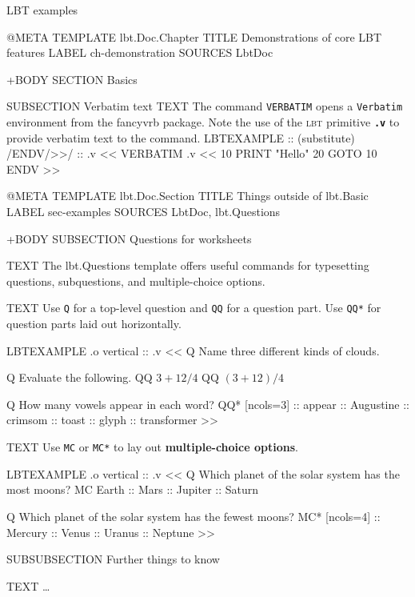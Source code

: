 \documentclass[a4paper,oneside,11pt,article]{memoir}
\begin{document}
\lbtDraftModeOff{}

{\Huge LBT examples}

\tableofcontents
\clearpage

\newcommand{\package}[1]{{\color{NavyBlue}\textsf{#1}}}
\newcommand{\code}[1]{{\color{NavyBlue}\texttt{#1}}}
\newcommand{\boldcode}[1]{{\bfseries\color{NavyBlue}\texttt{#1}}}
\newcommand{\lbtlogo}{\textsc{lbt}}

\begin{lbt}
  @META
    TEMPLATE   lbt.Doc.Chapter
    TITLE      Demonstrations of core LBT features
    LABEL      ch-demonstration
    SOURCES    LbtDoc

  +BODY
    SECTION Basics

    SUBSECTION Verbatim text
    TEXT The command \code{VERBATIM} opens a \code{Verbatim} environment from the \package{fancyvrb} package. Note the use of the \lbtlogo{} primitive \boldcode{.v} to provide verbatim text to the command.
    LBTEXAMPLE :: (substitute) /ENDV/>>/ :: .v <<
      VERBATIM .v <<
        10 PRINT "Hello"
        20 GOTO 10
      ENDV
    >>
\end{lbt}

\begin{lbt}
  @META
    TEMPLATE   lbt.Doc.Section
    TITLE      Things outside of lbt.Basic
    LABEL      sec-examples
    SOURCES    LbtDoc, lbt.Questions

  +BODY
    SUBSECTION Questions for worksheets

    TEXT The \package{lbt.Questions} template offers useful commands for typesetting questions, subquestions, and multiple-choice options.

    TEXT Use \code{Q} for a top-level question and \code{QQ} for a question part. Use \code{QQ*} for question parts laid out horizontally.

    LBTEXAMPLE .o vertical :: .v <<
      Q Name three different kinds of clouds.

      Q Evaluate the following.
      QQ $3 + 12 / 4$
      QQ $(3 + 12) / 4$

      Q How many vowels appear in each word?
      QQ* [ncols=3]
      :: appear :: Augustine :: crimsom :: toast :: glyph :: transformer
    >>

    TEXT Use \code{MC} or \code{MC*} to lay out \textbf{multiple-choice options}.

    LBTEXAMPLE .o vertical :: .v <<
      Q Which planet of the solar system has the most moons?
      MC Earth :: Mars :: Jupiter :: Saturn

      Q Which planet of the solar system has the fewest moons?
      MC* [ncols=4] :: Mercury :: Venus :: Uranus :: Neptune
    >>

    SUBSUBSECTION Further things to know

    TEXT \dots

\end{lbt}
\end{document}
